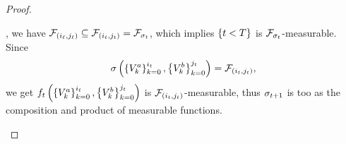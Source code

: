 \begin{proof}
\begin{enumerate}
{                
            }
            \subseteq
        \), we have 
        \(
            \mathcal{F}_{
                \left(
                    i_{\ell},
                    j_{\ell}
                \right)
            }
            \subseteq
            \mathcal{F}_{
                \left(
                    i_{t},
                    j_{t}
                \right)
            }
            =
            \mathcal{F}_{
                \sigma_{t}
            }
        \), which implies
        \(
            \left\{
                t < T
            \right\}
        \)
        is 
        \(
            \mathcal{F}_{
                \sigma_{t}
            }
        \)-measurable.
        Since 
        \[
            \sigma\left(
                \left\{
                    V^a_{k}
                \right\}_{k=0}^{i_{t}}
                ,
                \left\{
                    V^b_{k}
                \right\}_{k=0}^{j_{t}}
            \right)
            =
            \mathcal{F}_{
                \left(
                    i_{t},
                    j_{t}
                \right)
            },
        \]
        we get 
        \(
            f_{t}\left(
                \left\{
                    V^a_{k}
                \right\}_{k=0}^{i_{t}}
                ,
                \left\{
                    V^b_{k}
                \right\}_{k=0}^{j_{t}}
            \right)
        \)
        is 
        \(
            \mathcal{F}_{
                \left(
                    i_{t},
                    j_{t}
                \right)
            }
        \)-measurable, thus 
        $\sigma_{t+1}$ is too as the composition and product of measurable functions.




\end{enumerate}
\end{proof}
